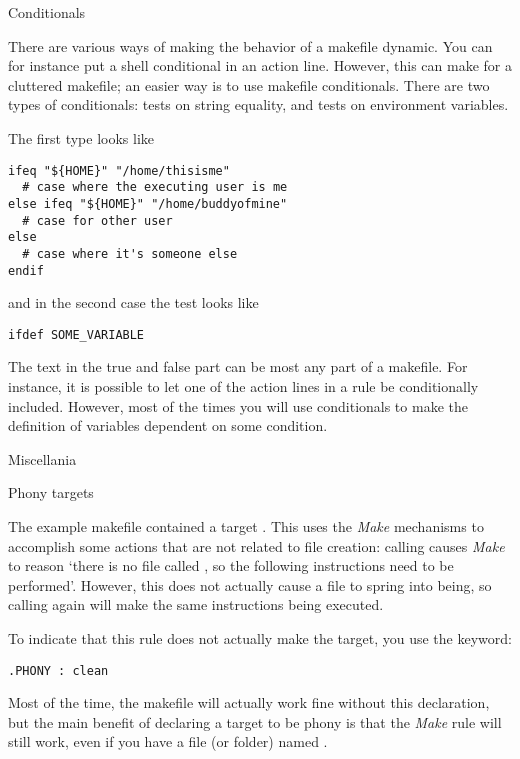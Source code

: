   
 {Conditionals}

There are various ways of making the behavior of a makefile dynamic.
You can for instance put a shell conditional in an action line.
However, this can make for a cluttered makefile; an easier way is to use
makefile conditionals. There are two types of conditionals: tests on string
equality, and tests on environment variables.

The first type looks like
\begin{verbatim}
ifeq "${HOME}" "/home/thisisme"
  # case where the executing user is me
else ifeq "${HOME}" "/home/buddyofmine"
  # case for other user 
else
  # case where it's someone else
endif
\end{verbatim}
and in the second case the test looks like
\begin{verbatim}
ifdef SOME_VARIABLE
\end{verbatim}
The text in the true and false part can be most any part of a
makefile. For instance, it is possible to let one of the action lines
in a rule be conditionally included. However, most of the times you
will use conditionals to make the definition of variables dependent on
some condition.


 {Miscellania}

 {Phony targets}

The example makefile contained a target . This uses
the \emph{Make} mechanisms to accomplish some actions that are not
related to file creation: calling  causes \emph{Make} to
reason `there is no file called , so the following
instructions need to be performed'. However, this does not actually
cause a file  to spring into being, so calling 
again will make the same instructions being executed.

To indicate that this rule does not actually make the target, you use
the  keyword:
\begin{verbatim}
.PHONY : clean
\end{verbatim}
Most of the time, the makefile will actually work fine without this
declaration, but the main benefit of declaring a target to be phony is
that the \emph{Make} rule will still work, even if you have a file (or folder)
named .

